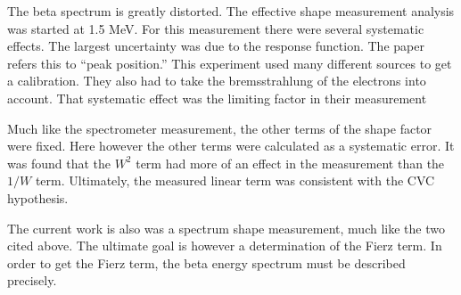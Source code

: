 \documentclass[../MaxHughesThesis.tex]{subfiles}
\begin{document}
The beta spectrum is greatly distorted.
The effective shape measurement analysis was started at 1.5 MeV.
For this measurement there were several systematic effects.
The largest uncertainty was due to the response function.
The paper refers this to ``peak position.'' 
This experiment used many different sources to get a calibration.
They also had to take the bremsstrahlung of the electrons into account.
That systematic effect was the limiting factor in their measurement

Much like the spectrometer measurement, the other terms of the shape factor were fixed.
Here however the other terms were calculated as a systematic error.
It was found that the $W^{2}$ term had more of an effect in the measurement than the $1/W$ term.
Ultimately, the measured linear term was consistent with the CVC hypothesis. 

The current work is also was a spectrum shape measurement, much like the two cited above.
The ultimate goal is however a  determination of the Fierz term. 
In order to get the Fierz term, the beta energy spectrum must be described precisely.
\end{document}
